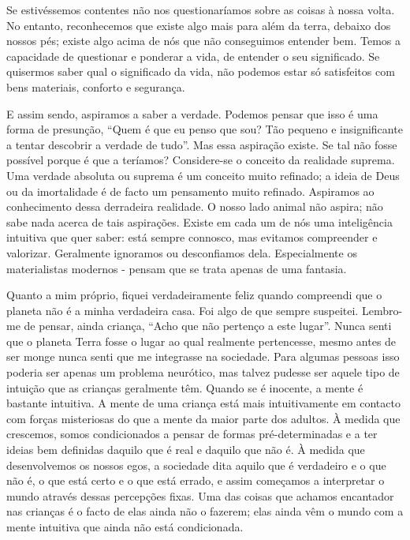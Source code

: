 Se estivéssemos contentes não nos questionaríamos sobre as coisas à nossa volta.
No entanto, reconhecemos que existe algo mais para além da terra, debaixo dos
nossos pés; existe algo acima de nós que não conseguimos entender bem. Temos a
capacidade de questionar e ponderar a vida, de entender o seu significado. Se
quisermos saber qual o significado da vida, não podemos estar só satisfeitos com
bens materiais, conforto e segurança.

E assim sendo, aspiramos a saber a verdade. Podemos pensar que isso é uma forma
de presunção, “Quem é que eu penso que sou? Tão pequeno e insignificante a
tentar descobrir a verdade de tudo”. Mas essa aspiração existe. Se tal não fosse
possível porque é que a teríamos? Considere-se o conceito da realidade suprema.
Uma verdade absoluta ou suprema é um conceito muito refinado; a ideia de Deus ou
da imortalidade é de facto um pensamento muito refinado. Aspiramos ao
conhecimento dessa derradeira realidade. O nosso lado animal não aspira; não
sabe nada acerca de tais aspirações. Existe em cada um de nós uma inteligência
intuitiva que quer saber: está sempre connosco, mas evitamos compreender e
valorizar. Geralmente ignoramos ou desconfiamos dela. Especialmente os
materialistas modernos - pensam que se trata apenas de uma fantasia.

Quanto a mim próprio, fiquei verdadeiramente feliz quando compreendi que o
planeta não é a minha verdadeira casa. Foi algo de que sempre suspeitei.
Lembro-me de pensar, ainda criança, “Acho que não pertenço a este lugar”. Nunca
senti que o planeta Terra fosse o lugar ao qual realmente pertencesse, mesmo
antes de ser monge nunca senti que me integrasse na sociedade. Para algumas
pessoas isso poderia ser apenas um problema neurótico, mas talvez pudesse ser
aquele tipo de intuição que as crianças geralmente têm. Quando se é inocente, a
mente é bastante intuitiva. A mente de uma criança está mais intuitivamente em
contacto com forças misteriosas do que a mente da maior parte dos adultos. À
medida que crescemos, somos condicionados a pensar de formas pré-determinadas e
a ter ideias bem definidas daquilo que é real e daquilo que não é. À medida que
desenvolvemos os nossos egos, a sociedade dita aquilo que é verdadeiro e o que
não é, o que está certo e o que está errado, e assim começamos a interpretar o
mundo através dessas percepções fixas. Uma das coisas que achamos encantador nas
crianças é o facto de elas ainda não o fazerem; elas ainda vêm o mundo com a
mente intuitiva que ainda não está condicionada.

